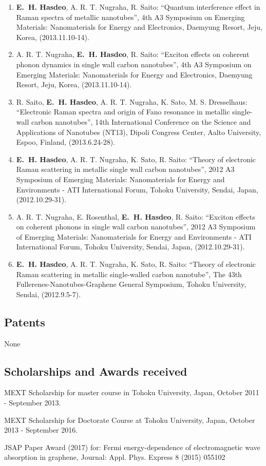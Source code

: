 \documentclass[a4paper,11pt]{article}
\newcommand{\jjm}[5]{\item {#1}: {``#2''}, {#3}, {#5}, (#4).}
\newcommand{\rs}{R. Saito}
\def\hes{{\bf E.~H. Hasdeo}}
\renewenvironment{itemize}{
  \begin{list}{}{
      \setlength{\leftmargin}{1.5em}
      \setlength{\parskip}{0pt}
      \setlength{\parsep}{0pt}
      \setlength{\itemsep}{3pt}
  }
}{
  \end{list}
}
\begin{document}
\begin{enumerate}
\jjm{\hes, A. R. T. Nugraha, \rs}
{Quantum interference effect in Raman spectra of metallic nanotubes}
{4th A3 Symposium on Emerging Materials: Nanomaterials for Energy and
Electronics}
{2013.11.10-14}{Daemyung Resort, Jeju, Korea}
\jjm{A. R. T. Nugraha, \hes, \rs}
{Exciton effects on coherent phonon dynamics in single wall carbon nanotubes}
{4th A3 Symposium on Emerging Materials: Nanomaterials for Energy and
Electronics}
{2013.11.10-14}{Daemyung Resort, Jeju, Korea}


\jjm{\rs, \hes, A. R. T. Nugraha, K. Sato, M. S. Dresselhaus}
{Electronic Raman spectra and origin of Fano resonance in metallic
single-wall carbon nanotubes}
{14th International Conference on the Science and Applications of Nanotubes (NT13)}
{2013.6.24-28}{Dipoli Congress Center, Aalto University, Espoo, Finland} 

\jjm{\hes, A. R. T. Nugraha, K. Sato, \rs}
{Theory of electronic Raman scattering in metallic single wall carbon
  nanotubes}
{2012 A3 Symposium of Emerging Materials: Nanomaterials for Energy and
Environments - ATI International Forum}
{2012.10.29-31}{Tohoku University, Sendai, Japan}

\jjm{A. R. T. Nugraha, E. Rosenthal, \hes, \rs}
{Exciton effects on coherent phonons in single wall carbon nanotubes}
{2012 A3 Symposium of Emerging Materials: Nanomaterials for Energy and
Environments - ATI International Forum}
{2012.10.29-31}{Tohoku University, Sendai, Japan}

\jjm{\hes, A. R. T. Nugraha, K. Sato, \rs}
{Theory of electronic Raman scattering in metallic single-walled carbon nanotube}
{The 43th Fullerenes-Nanotubes-Graphene General Symposium}
{2012.9.5-7}{Tohoku University, Sendai}

\end{enumerate}

\vspace*{\baselineskip}

\subsection{Patents}
None
\vspace*{\baselineskip}

\subsection{Scholarships and Awards received}
\begin{itemize}%
\item MEXT Scholarship for master course in Tohoku University, Japan,
  October 2011 - September 2013.
\item MEXT Scholarship for Doctorate Course at Tohoku University, Japan,
  October 2013 - September 2016.
 \item JSAP Paper Award (2017)  for: Fermi energy-dependence of electromagnetic wave absorption in graphene, 
   Journal: Appl. Phys. Express 8 (2015) 055102
\end{itemize}
\end{document}
